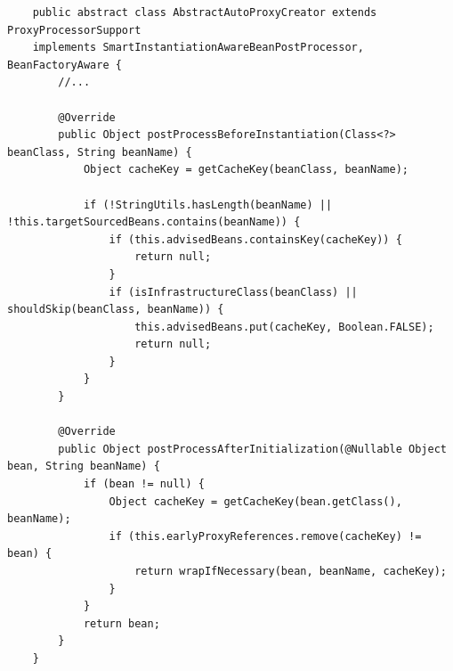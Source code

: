 \documentclass{scrartcl}
\begin{document}
\begin{lstlisting}
    public abstract class AbstractAutoProxyCreator extends ProxyProcessorSupport
    implements SmartInstantiationAwareBeanPostProcessor, BeanFactoryAware {
        //...

        @Override
        public Object postProcessBeforeInstantiation(Class<?> beanClass, String beanName) {
            Object cacheKey = getCacheKey(beanClass, beanName);

            if (!StringUtils.hasLength(beanName) || !this.targetSourcedBeans.contains(beanName)) {
                if (this.advisedBeans.containsKey(cacheKey)) {
                    return null;
                }
                if (isInfrastructureClass(beanClass) || shouldSkip(beanClass, beanName)) {
                    this.advisedBeans.put(cacheKey, Boolean.FALSE);
                    return null;
                }
            }
        }

        @Override
        public Object postProcessAfterInitialization(@Nullable Object bean, String beanName) {
            if (bean != null) {
                Object cacheKey = getCacheKey(bean.getClass(), beanName);
                if (this.earlyProxyReferences.remove(cacheKey) != bean) {
                    return wrapIfNecessary(bean, beanName, cacheKey);
                }
            }
            return bean;
        }
    }
\end{lstlisting}
\end{document}
